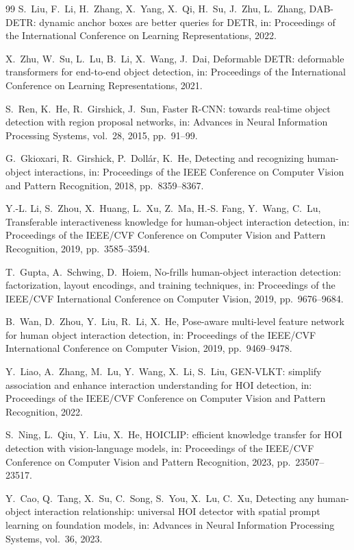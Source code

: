 \documentclass[12pt,a4paper]{article}
\begin{document}
{\begin{thebibliography}{99}
S.~Liu, F.~Li, H.~Zhang, X.~Yang, X.~Qi, H.~Su, J.~Zhu, L.~Zhang, DAB-DETR: dynamic anchor boxes are better queries for DETR, in: Proceedings of the International Conference on Learning Representations, 2022.

X.~Zhu, W.~Su, L.~Lu, B.~Li, X.~Wang, J.~Dai, Deformable DETR: deformable transformers for end-to-end object detection, in: Proceedings of the International Conference on Learning Representations, 2021.

S.~Ren, K.~He, R.~Girshick, J.~Sun, Faster R-CNN: towards real-time object detection with region proposal networks, in: Advances in Neural Information Processing Systems, vol.~28, 2015, pp.~91--99.

G.~Gkioxari, R.~Girshick, P.~Doll\'{a}r, K.~He, Detecting and recognizing human-object interactions, in: Proceedings of the IEEE Conference on Computer Vision and Pattern Recognition, 2018, pp.~8359--8367.

Y.-L. Li, S.~Zhou, X.~Huang, L.~Xu, Z.~Ma, H.-S. Fang, Y.~Wang, C.~Lu, Transferable interactiveness knowledge for human-object interaction detection, in: Proceedings of the IEEE/CVF Conference on Computer Vision and Pattern Recognition, 2019, pp.~3585--3594.

T.~Gupta, A.~Schwing, D.~Hoiem, No-frills human-object interaction detection: factorization, layout encodings, and training techniques, in: Proceedings of the IEEE/CVF International Conference on Computer Vision, 2019, pp.~9676--9684.

B.~Wan, D.~Zhou, Y.~Liu, R.~Li, X.~He, Pose-aware multi-level feature network for human object interaction detection, in: Proceedings of the IEEE/CVF International Conference on Computer Vision, 2019, pp.~9469--9478.

Y.~Liao, A.~Zhang, M.~Lu, Y.~Wang, X.~Li, S.~Liu, GEN-VLKT: simplify association and enhance interaction understanding for HOI detection, in: Proceedings of the IEEE/CVF Conference on Computer Vision and Pattern Recognition, 2022.

S.~Ning, L.~Qiu, Y.~Liu, X.~He, HOICLIP: efficient knowledge transfer for HOI detection with vision-language models, in: Proceedings of the IEEE/CVF Conference on Computer Vision and Pattern Recognition, 2023, pp.~23507--23517.

Y.~Cao, Q.~Tang, X.~Su, C.~Song, S.~You, X.~Lu, C.~Xu, Detecting any human-object interaction relationship: universal HOI detector with spatial prompt learning on foundation models, in: Advances in Neural Information Processing Systems, vol.~36, 2023.


\end{thebibliography}}
\end{document}
